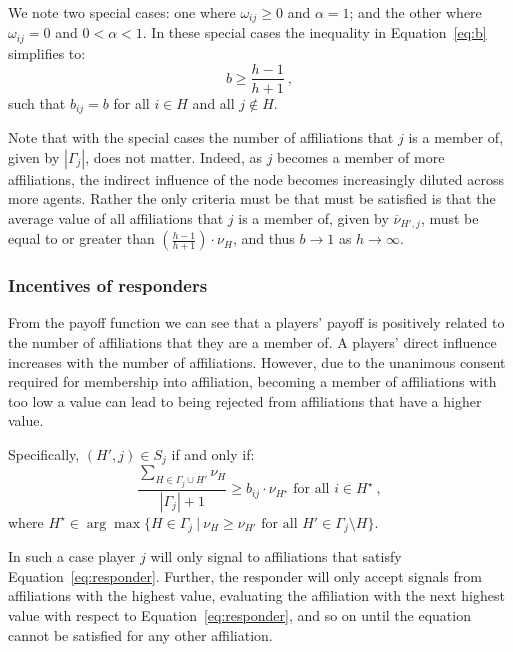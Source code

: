 \begin{subappendices}
We note two special cases: one where $\omega_{ij} \geqslant 0$ and $\alpha = 1$; and the other where $\omega_{ij} = 0$ and $0 < \alpha < 1$. In these special cases the inequality in Equation~\ref{eq:b} simplifies to:
\begin{equation}
b \geqslant \frac{h - 1}{h + 1} ~ ,
\end{equation}
such that $b_{ij} = b$ for all $i \in H$ and all $j \notin H$.

Note that with the special cases the number of affiliations that $j$ is a member of, given by $| \Gamma_{j} |$, does not matter. Indeed, as $j$ becomes a member of more affiliations, the indirect influence of the node becomes increasingly diluted across more agents. Rather the only criteria must be that must be satisfied is that the average value of all affiliations that $j$ is a member of, given by $\overline{\nu}_{H',j}$, must be equal to or greater than $\left( \frac{h - 1}{h + 1} \right) \cdot \nu_{H}$, and thus $b \rightarrow 1$ as $h \rightarrow \infty$.

\subsubsection*{Incentives of responders}

From the payoff function we can see that a players' payoff is positively related to the number of affiliations that they are a member of. A players' direct influence increases with the number of affiliations. However, due to the unanimous consent required for membership into affiliation, becoming a member of affiliations with too low a value can lead to being rejected from affiliations that have a higher value.

Specifically, $(H',j) \in S_{j}$ if and only if:
\begin{equation} \label{eq:responder}
\frac{\sum_{H \in \Gamma_{j} \cup H'} \nu_{H}}{| \Gamma_{j} | + 1} \geqslant b_{ij} \cdot \nu_{H^{\star}} \mbox{ for all } i \in H^{\star} ~ ,
\end{equation}
where $H^{\star} \in \arg\max\{H \in \Gamma_{j} ~ | ~ \nu_{H} \geqslant \nu_{H'} \mbox{ for all } H' \in \Gamma_{j} \setminus H \}$.

In such a case player $j$ will only signal to affiliations that satisfy Equation~\ref{eq:responder}. Further, the responder will only accept signals from affiliations with the highest value, evaluating the affiliation with the next highest value with respect to Equation~\ref{eq:responder}, and so on until the equation cannot be satisfied for any other affiliation.


\end{subappendices}
